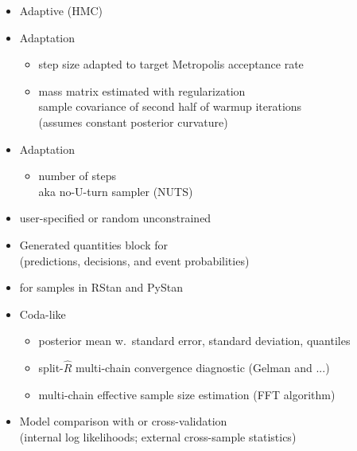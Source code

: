 \documentclass[10pt]{report}
\newcommand{\sld}[1]{\newpage{\noindent\LARGE \ \ \
    \textcolor{MidnightBlue}{\bfseries #1}}\vspace*{4pt}}
\newcommand{\myemph}[1]{{\color{MidnightBlue}{\bfseries #1}}}
\begin{document}
\sld{Full Bayes with MCMC}

\begin{itemize}
\item Adaptive \myemph{Hamiltonian Monte Carlo} (HMC)
%
\item Adaptation \myemph{during warmup}
\vspace*{-4pt}
\begin{itemize}\small
\item step size adapted to target Metropolis acceptance rate
\item mass matrix estimated with regularization
{\footnotesize
\\ sample covariance of second half of warmup iterations
\\ (assumes constant posterior curvature)
}
\end{itemize}
%
\item Adaptation \myemph{during sampling}
\vspace*{-4pt}
\begin{itemize}\small
\item number of steps
\\
{\footnotesize aka no-U-turn sampler (NUTS)}
\end{itemize}
%
\item \myemph{Initialization} user-specified or random unconstrained
\end{itemize}


\sld{Posterior Inference}

\begin{itemize}
\item Generated quantities block for \myemph{inference}
\\ {\footnotesize (predictions, decisions, and event probabilities)}
\item \myemph{Extractors} for samples in RStan and PyStan
\item Coda-like \myemph{posterior summary}
\vspace*{-4pt}
\begin{itemize}\small
\item posterior mean w.\ standard error, standard deviation, quantiles
\item split-$\hat{R}$ multi-chain convergence diagnostic (Gelman and ...)
\item multi-chain effective sample size estimation (FFT algorithm)
\end{itemize}
\item Model comparison with \myemph{WAIC} or cross-validation
\\
{\footnotesize (internal log likelihoods; external cross-sample statistics)}
\end{itemize}
\end{document}
